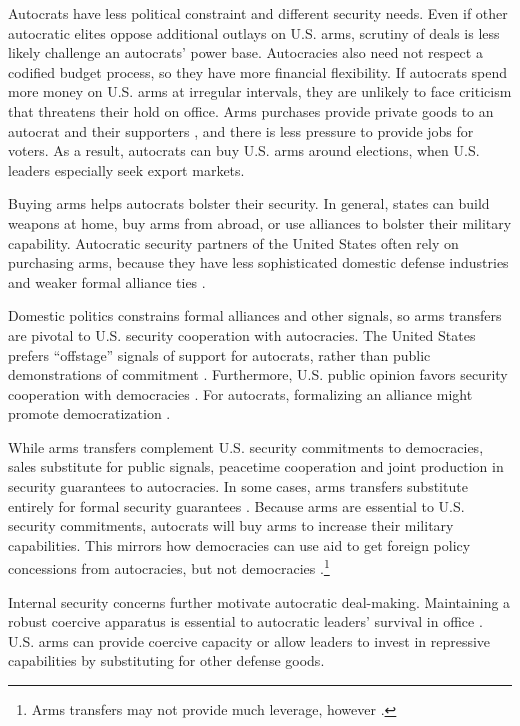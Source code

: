 \documentclass[12pt]{article}
\begin{document}
Autocrats have less political constraint and different security needs.
Even if other autocratic elites oppose additional outlays on U.S. arms, scrutiny of deals is less likely challenge an autocrats' power base. 
Autocracies also need not respect a codified budget process, so they have more financial flexibility.
If autocrats spend more money on U.S. arms at irregular intervals, they are unlikely to face criticism that threatens their hold on office. 
Arms purchases provide private goods to an autocrat and their supporters \citep{BDMetal2002}, and there is less pressure to provide jobs for voters. 
As a result, autocrats can buy U.S. arms around elections, when U.S. leaders especially seek export markets.   


Buying arms helps autocrats bolster their security.
In general, states can build weapons at home, buy arms from abroad, or use alliances to bolster their military capability. 
Autocratic security partners of the United States often rely on purchasing arms, because they have less sophisticated domestic defense industries \citep{Bitzinger2003} and weaker formal alliance ties \citep{Yarhi-Miloetal2016}. 


Domestic politics constrains formal alliances and other signals, so arms transfers are pivotal to U.S. security cooperation with autocracies.  
The United States prefers ``offstage'' signals of support for autocrats, rather than public demonstrations of commitment \citep{McManusYarhi-Milo2017}.
Furthermore, U.S. public opinion favors security cooperation with democracies \citep{Alley2023}. 
For autocrats, formalizing an alliance might promote democratization \citep{GiblerWolford2006}.


While arms transfers complement U.S. security commitments to democracies, sales substitute for public signals, peacetime cooperation and joint production in security guarantees to autocracies.
In some cases, arms transfers substitute entirely for formal security guarantees \citep{Yarhi-Miloetal2016}. 
Because arms are essential to U.S. security commitments, autocrats will buy arms to increase their military capabilities.
This mirrors how democracies can use aid to get foreign policy concessions from autocracies, but not democracies \citep{BDMSmith2009}.\footnote{Arms transfers may not provide much leverage, however \citep{Spindel2023}.}


Internal security concerns further motivate autocratic deal-making. 
Maintaining a robust coercive apparatus is essential to autocratic leaders' survival in office \citep{Boix2008}. 
U.S. arms can provide coercive capacity or allow leaders to invest in repressive capabilities by substituting for other defense goods. 
\end{document}
